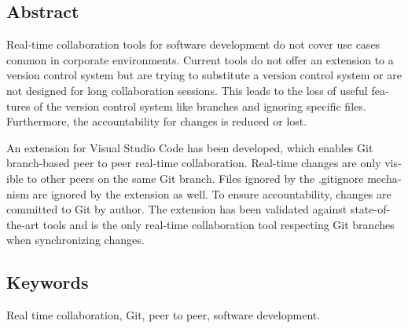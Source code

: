 
\begin{otherlanguage}{english}

  \chapter*{Abstract}

  Real-time collaboration tools for software development do not cover use cases common in corporate environments. Current tools do not offer an extension to a version control system but are trying to substitute a version control system or are not designed for long collaboration sessions. This leads to the loss of useful features of the version control system like branches and ignoring specific files. Furthermore, the accountability for changes is reduced or lost.

  An extension for Visual Studio Code has been developed, which enables Git branch-based peer to peer real-time collaboration. Real-time changes are only visible to other peers on the same Git branch. Files ignored by the .gitignore mechanism are ignored by the extension as well. To ensure accountability, changes are committed to Git by author. The extension has been validated against state-of-the-art tools and is the only real-time collaboration tool respecting Git branches when synchronizing changes.

  \bigskip

  \section*{Keywords}
  Real time collaboration, Git, peer to peer, software development.

\end{otherlanguage}
